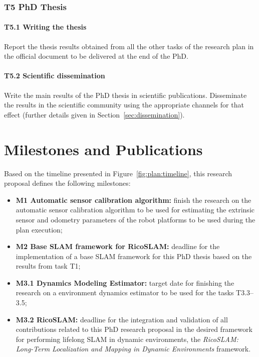 \subsubsection*{T5 PhD Thesis}

\paragraph{T5.1 Writing the thesis} Report the thesis results obtained from all the other tasks of the research plan in the official document to be delivered at the end of the PhD.

\paragraph{T5.2 Scientific dissemination} Write the main results of the PhD thesis in scientific publications. Disseminate the results in the scientific community using the appropriate channels for that effect (further details given in Section~\ref{sec:dissemination}).






\section{Milestones and Publications}\label{sec:milestones}

Based on the timeline presented in Figure~\ref{fig:plan:timeline}, this research proposal defines the following milestones:

\begin{itemize}[nosep]
\item \textbf{M1 Automatic sensor calibration algorithm:} finish the research on the automatic sensor calibration algorithm to be used for estimating the extrinsic sensor and odometry parameters of the robot platforms to be used during the plan execution;
\item \textbf{M2 Base \gls{SLAM} framework for RicoSLAM:} deadline for the implementation of a base \gls{SLAM} framework for this PhD thesis based on the results from task T1;
\item \textbf{M3.1 Dynamics Modeling Estimator:} target date for finishing the research on a environment dynamics estimator to be used for the tasks T3.3--3.5;
\item \textbf{M3.2 RicoSLAM:} deadline for the integration and validation of all contributions related to this PhD research proposal in the desired framework for performing lifelong \gls{SLAM} in dynamic environments, the \textit{RicoSLAM: Long-Term Localization and Mapping in Dynamic Environments} framework.
\end{itemize}

